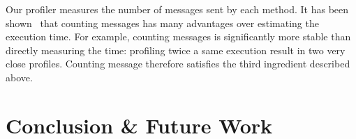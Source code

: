 \documentclass{sig-alternate}
\begin{document}
Our profiler measures the number of messages sent by each method. It has been shown~\cite{Berg11d} that counting messages has many advantages over estimating the execution time. For example, counting messages is significantly more stable than directly measuring the time: profiling twice a same execution result in two very close profiles. Counting message therefore satisfies the third ingredient described above.


\section{Conclusion \& Future Work}





\end{document}
